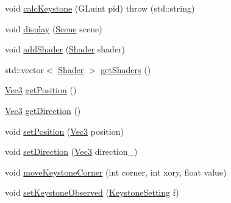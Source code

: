 \begin{DoxyCompactItemize}
\item 
void \hyperlink{classProjector_a6ea6b55198d6fdfdf7b28c612e95ec26}{calcKeystone} (GLuint pid)  throw (std::string)
\item 
void \hyperlink{classProjector_a6e2ac751c6dafa3048eb25359ed0cd05}{display} (\hyperlink{classScene}{Scene} scene)
\item 
void \hyperlink{classProjector_a6dfc533175a56a0bf2989b5c0c917a36}{addShader} (\hyperlink{classShader}{Shader} shader)
\item 
std::vector$<$ \hyperlink{classShader}{Shader} $>$ \hyperlink{classProjector_ae356e74b51ffa74a9915b71825b2a774}{getShaders} ()
\item 
\hyperlink{structVec3}{Vec3} \hyperlink{classProjector_a68c643eead5cbe093e1c995c35d3a247}{getPosition} ()
\item 
\hyperlink{structVec3}{Vec3} \hyperlink{classProjector_a2094b745b60702602ab037d6485d030d}{getDirection} ()
\item 
void \hyperlink{classProjector_a8c606ce355da71accf80afe0ad8ab778}{setPosition} (\hyperlink{structVec3}{Vec3} position)
\item 
void \hyperlink{classProjector_a3bbcc7b641d3941cf347b3ce61fda7d6}{setDirection} (\hyperlink{structVec3}{Vec3} direction\_\-)
\item 
void \hyperlink{classProjector_af7fabc0089d4a6c961d473b009a3b50d}{moveKeystoneCorner} (int corner, int xory, float value)
\item 
void \hyperlink{classProjector_a47f7376f32cae68d15e35f4690351c50}{setKeystoneObserved} (\hyperlink{structKeystoneSetting}{KeystoneSetting} f)
\end{DoxyCompactItemize}


